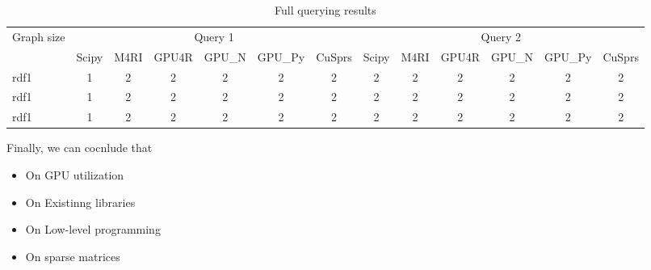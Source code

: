 \begin{table*}
\caption{Full querying results}
\label{tbl:tableFull}
\begin{tabular}{| l | c | c | c | c | c | c | c | c | c | c | c | c |}
    \hline
    \multirow{2}{*}{Graph size} & \multicolumn{6}{|c|}{Query 1}                               & \multicolumn{6}{|c|}{Query 2} \\
    \cline{2-13}
                         & Scipy & M4RI & GPU4R & GPU\_N & GPU\_Py & CuSprs & Scipy & M4RI & GPU4R & GPU\_N & GPU\_Py & CuSprs \\
    \hline
    \hline
    rdf1 & 1 & 2 & 2& 2& 2& 2& 2& 2& 2& 2& 2& 2\\
    rdf1 & 1 & 2 & 2& 2& 2& 2& 2& 2& 2& 2& 2& 2\\
    rdf1 & 1 & 2 & 2& 2& 2& 2& 2& 2& 2& 2& 2& 2\\
    \hline
  \end{tabular}
\end{table*}


Finally, we can cocnlude that
\begin{itemize}
\item On GPU utilization
\item On Existinng libraries
\item On Low-level programming
\item On sparse matrices
\end{itemize}
